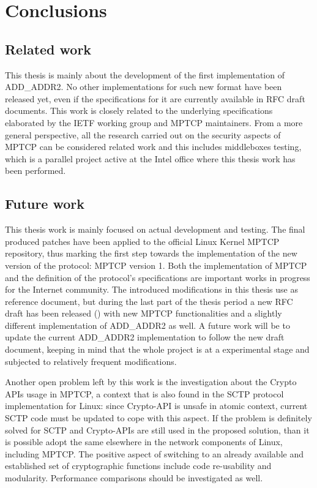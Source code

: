 \chapter{Conclusions}
\label{chap:conclusions}

\section{Related work}
This thesis is mainly about the development of the first implementation of ADD\_ADDR2. No other implementations for such new format have been released yet, even if the specifications for it are currently available in RFC draft documents. This work is closely related to the underlying specifications elaborated by the IETF working group and MPTCP maintainers. From a more general perspective, all the research carried out on the security aspects of MPTCP can be considered related work and this includes middleboxes testing, which is a parallel project active at the Intel office where this thesis work has been performed. 

\section{Future work}
\label{future}
This thesis work is mainly focused on actual development and testing. The final produced patches have been applied to the official Linux Kernel MPTCP repository, thus marking the first step towards the implementation of the new version of the protocol: MPTCP version 1. 
Both the implementation of MPTCP and the definition of the protocol's specifications are important works in progress for the Internet community. The introduced modifications in this thesis use  as reference document, but during the last part of the thesis period a new RFC draft has been released () with new MPTCP functionalities and a slightly different implementation of ADD\_ADDR2 as well. A future work will be to update the current ADD\_ADDR2 implementation to follow the new draft document, keeping in mind that the whole project is at a experimental stage and subjected to relatively frequent modifications.

Another open problem left by this work is the investigation about the Crypto APIs usage in MPTCP, a context that is also found in the SCTP protocol implementation for Linux: since Crypto-API is unsafe in atomic context, current SCTP code must be updated to cope with this aspect. If the problem is definitely solved for SCTP and Crypto-APIs are still used in the proposed solution, than it is possible adopt the same elsewhere in the network components of Linux, including MPTCP. The positive aspect of switching to an already available and established set of cryptographic functions include code re-usability and modularity. Performance comparisons should be investigated as well.

